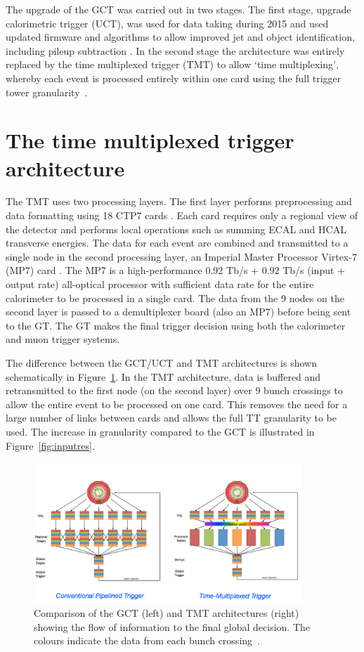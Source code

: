 The upgrade of the GCT was carried out in two stages. The first stage,
upgrade calorimetric trigger (UCT), was used for data taking during 2015
and used updated firmware and algorithms to allow improved jet and object 
identification, including pileup subtraction \cite{uct}. In the second stage the 
architecture was entirely replaced by the time multiplexed trigger (TMT) 
to allow `time multiplexing', whereby each
event is processed entirely within one card using the full trigger tower granularity~\cite{tmt}. 

\section{The time multiplexed trigger architecture}

The TMT uses two processing layers. The first layer performs
preprocessing and data formatting using 18 CTP7 cards \cite{mp7}. Each card requires
only a regional view of the detector and performs local operations such as summing 
ECAL and HCAL transverse energies. The data for each event are combined and transmitted to 
a single node in the second processing layer, an Imperial Master Processor Virtex-7 (MP7) card \cite{mp7}. 
The MP7 is a high-performance 0.92 Tb/s + 0.92 Tb/s (input + output rate) all-optical processor 
with sufficient data rate for the entire calorimeter to be processed in a single card. The data 
from the 9 nodes on the second layer is passed to a demultiplexer board (also an MP7) before
being sent to the GT. The GT makes the final trigger decision using both the calorimeter
and muon trigger systems.

The difference between the GCT/UCT and TMT architectures is shown schematically in Figure~\ref{tmux}. 
In the TMT architecture, data is buffered and retransmitted to the first node (on the second layer)
over 9 bunch crossings to allow the entire event to be processed on one card. This
removes the need for a large number of links between cards and allows the full TT 
granularity to be used. The increase in granularity compared to the GCT is
illustrated in Figure~\ref{fig:inputres}. 

\begin{figure}

\centering
    \includegraphics[width=0.9\textwidth]{./Figures/triggerUpgrade/tmux}
  \caption{Comparison of the GCT (left) and TMT architectures (right) showing the flow of information
  to the final global decision. The colours indicate the data from each bunch crossing~\cite{tmt}.}
  \label{tmux}
\end{figure}

